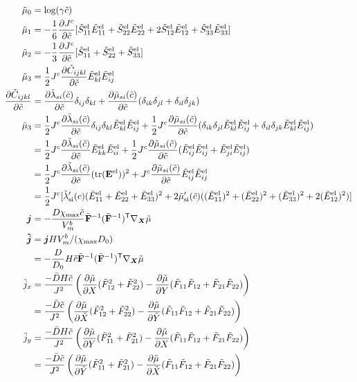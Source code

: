 \documentclass[../main.tex]{subfiles}
\begin{document}
\begin{align}
    \td{\mu}_0 &= \text{log}(\gamma \td{c}) \\
    \td{\mu}_1 &= -\fc{1}{6}\pdiff{\jc}{\tc} [\tSel{11}\tEel{11} + \tSel{22}\tEel{22} + 2\tSel{12}\tEel{12} + \tSel{33}\tEel{33}] \\
    \td{\mu}_2 &= -\fc{1}{3}\pdiff{ \jc}{\tc}[\tSel{11} + \tSel{22} + \tSel{33}] \\
    \td{\mu}_3 &= \fc{1}{2}\jc \pdiff{ \td{C}_{ijkl}}{\tc}\tEel{kl}\tEel{ij} \\
    \pdiff{\td{C}_{ijkl}}{\tc} &= \pdiff{\td{\lambda}_{si}(\tc)}{\tc}\delta_{ij} \delta_{kl} +  \pdiff{\td{\mu}_{si}(\tc)}{\tc}(\delta_{ik} \delta_{jl} + \delta_{il} \delta_{jk})  \\
    \td{\mu}_3  &=  \fc{1}{2}\jc \pdiff{\td{\lambda}_{si}(\tc)}{\tc}\delta_{ij} \delta_{kl} \tEel{kl}\tEel{ij} + \fc{1}{2}\jc\pdiff{\td{\mu}_{si}(\tc)}{\tc}(\delta_{ik} \delta_{jl} \tEel{kl}\tEel{ij} + \delta_{il} \delta_{jk} \tEel{kl}\tEel{ij}) \\
    &=  \fc{1}{2}\jc \pdiff{\td{\lambda}_{si}(\tc)}{\tc} \tEel{kk}\tEel{ii} + \fc{1}{2}\jc\pdiff{\td{\mu}_{si}(\tc)}{\tc}(\tEel{ij}\tEel{ij} +  \tEel{ji}\tEel{ij}) \\
    &=  \fc{1}{2}\jc \pdiff{\td{\lambda}_{si}(\tc)}{\tc} (\mathrm{tr}(\mathbf{E^{\rm{el}}}))^2 + \jc\pdiff{\td{\mu}_{si}(\tc)}{\tc}\tEel{ij}\tEel{ij} \\
    &= \fc{1}{2}\jc[\tlamsi'(c)(\tEel{11} + \tEel{22} + \tEel{33})^2 + 2\tmusi'(\td{c})((\tEel{11})^2 + (\tEel{22})^2 + (\tEel{33})^2 + 2 (\tEel{12})^2)]\\
    \bm{j} &= - \fc{D\xmax \tc}{V^b_m} \td{\F}^{-1} (\td{\F}^{-1})^\T \nabla_{\X} \td \mu \\
    \bm{\td j} &= \bm{j}H V_m^b/(\chi_{\text{max}}D_0)\\
                &= -\fc{D}{D_0}H \tc \td{\F}^{-1}(\td{\F}^{-1})^\T \nabla_{\X} \td \mu\\
    \td{j}_x &= \fc{-\bar{D} H \tc}{J^2} \left(\pdiff{ \td \mu}{X}(\tF{12}^2 + \tF{22}^2) - \pdiff{ \td \mu}{ Y}(\tF{11}\tF{12} + \tF{21}\tF{22})\right)\\
    &= \fc{-\bar{D}  \tc}{J^2} \left(\pdiff{ \td \mu}{\tX}(\tF{12}^2 + \tF{22}^2) - \pdiff{ \td \mu}{\tY}(\tF{11}\tF{12} + \tF{21}\tF{22})\right)\\
    \td{j}_y &= \fc{-\bar{D} H \tc}{J^2} \left(\pdiff{ \td \mu}{Y}(\tF{11}^2 + \tF{21}^2) - \pdiff{ \td \mu}{X}(\tF{11}\tF{12} + \tF{21}\tF{22})\right)\\
    &= \fc{-\bar{D}  \tc}{J^2} \left( \pdiff{ \td \mu}{\tY}(\tF{11}^2 + \tF{21}^2) -\pdiff{ \td \mu}{\tX}(\tF{11}\tF{12} + \tF{21}\tF{22})\right)\\
\end{align}
\end{document}
